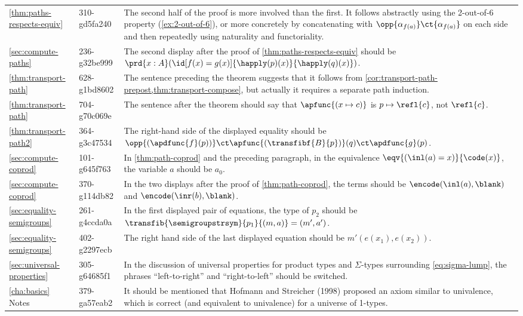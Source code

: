 \documentclass[
%
%
11pt %
]{article}
\begin{document}
\begin{longtable}{llp{10.5cm}}
  \cref{thm:paths-respects-equiv}
  & 310-gd5fa240
  & The second half of the proof is more involved than the first.
  It follows abstractly using the 2-out-of-6 property (\cref{ex:2-out-of-6}), or more concretely by concatenating with $\opp{\alpha_{f(a)}} \ct {\alpha_{f(a)}}$ on each side and then repeatedly using naturality and functoriality.\\
  \cref{sec:compute-paths}
  & 236-g32be999
  & The second display after the proof of \cref{thm:paths-respects-equiv} should be $\prd{x:A} (\id[f(x)=g(x)] {\happly(p)(x)}{\happly(q)(x)})$.\\
  \cref{thm:transport-path}
  & 628-g1bd8602
  & The sentence preceding the theorem suggests that it follows from \cref{cor:transport-path-prepost,thm:transport-compose}, but actually it requires a separate path induction.\\
  \cref{thm:transport-path}
  & 704-g70c069e
  & The sentence after the theorem should say that $\apfunc{(x \mapsto c)}$ is $p \mapsto\refl{c}$, not $\refl{c}$.\\
  \cref{thm:transport-path2}
  & 364-g3c47534
  & The right-hand side of the displayed equality should be $\opp{(\apdfunc{f}(p))} \ct \apfunc{(\transfibf{B}{p})}(q) \ct \apdfunc{g}(p)$.\\
  \cref{sec:compute-coprod}
  & 101-g645f763
  & In \cref{thm:path-coprod} and the preceding paragraph, in the equivalence $\eqv{(\inl(a)=x)}{\code(x)}$, the variable $a$ should be $a_0$. \\
  \cref{sec:compute-coprod}
  & 370-g114db82
  & In the two displays after the proof of \cref{thm:path-coprod}, the terms should be $\encode(\inl(a), {\blank})$ and $\encode(\inr(b), {\blank})$.\\
  \cref{sec:equality-semigroups}
  & 261-g4ccda0a
  & In the first displayed pair of equations, the type of $p_2$ should be $\transfib{\semigroupstrsym}{p_1}{(m,a)} = {(m',a')}$.\\
  \cref{sec:equality-semigroups}
  & 402-g2297ecb
  & The right hand side of the last displayed equation should be $m'(e(x_1),e(x_2))$.\\
  \cref{sec:universal-properties}
  & 305-g64685f1
  & In the discussion of universal properties for product types and $\Sigma$-types surrounding \cref{eq:sigma-lump}, the phrases ``left-to-right'' and ``right-to-left'' should be switched.\\
  \cref{cha:basics} Notes
  & 379-ga57eab2
  & It should be mentioned that Hofmann and Streicher (1998) proposed an axiom similar to univalence, which is correct (and equivalent to univalence) for a universe of 1-types.\\

\end{longtable}
\end{document}

